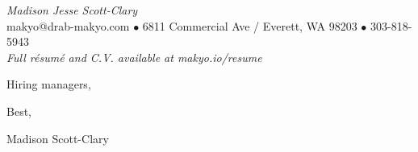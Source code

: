 \documentclass[letterpaper]{memoir}
\begin{document}
\begin{center}
  {\huge \textit{\color{titlegreydark} Madison Jesse Scott-Clary}}\\
  {\color{titlegreydark} makyo@drab-makyo.com $\bullet$ 6811 Commercial Ave / Everett, WA 98203 $\bullet$ 303-818-5943}\\
  {\small \color{titlegreylight} \textit{Full r\'esum\'e and C.V. available at makyo.io/resume}}
\end{center}

\vspace{0.5in}

\noindent Hiring managers,

\vspace{0.25in}

\noindent 

\vspace{0.25in}

Best,

\vspace{0.25in}

Madison Scott-Clary
\end{document}
